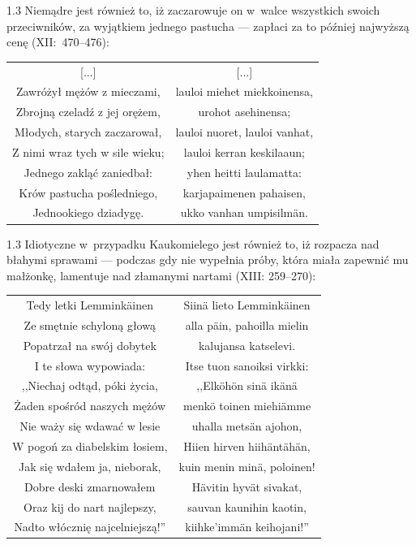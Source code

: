 \documentclass[11pt,a4paper,twoside]{report}
\begin{document}
\begin{spacing}{1.3}
Niemądre jest również to, iż zaczarowuje on w~walce wszystkich swoich przeciwników, za wyjątkiem jednego pastucha --- zapłaci za to później najwyższą cenę (XII:~470--476):
\end{spacing}
{\centering
\small
\begin{longtable}{c c}
{[...]} & {[...]} \\
Zawróżył mężów z mieczami, & lauloi miehet miekkoinensa, \\
Zbrojną czeladź z jej orężem, & urohot asehinensa; \\
Młodych, starych zaczarował, & lauloi nuoret, lauloi vanhat, \\
Z nimi wraz tych w sile wieku; & lauloi kerran keskilaaun; \\
Jednego zakląć zaniedbał: & yhen heitti laulamatta: \\
Krów pastucha pośledniego, & karjapaimenen pahaisen, \\
Jednookiego dziadygę. & ukko vanhan umpisilmän. \\
\end{longtable}
}
\newpage
\begin{spacing}{1.3}
Idiotyczne w~przypadku Kaukomielego jest również to, iż rozpacza nad błahymi sprawami --- podczas gdy nie wypełnia próby, która miała zapewnić mu małżonkę, lamentuje nad złamanymi nartami (XIII: 259--270):
\end{spacing}
{\centering
\small
\begin{longtable}{c c}
Tedy letki Lemminkäinen & Siinä lieto Lemminkäinen \\
Ze smętnie schyloną głową & alla päin, pahoilla mielin \\
Popatrzał na swój dobytek & kalujansa katselevi. \\
I te słowa wypowiada: & Itse tuon sanoiksi virkki: \\
,,Niechaj odtąd, póki życia, & ,,Elköhön sinä ikänä \\
Żaden spośród naszych mężów & menkö toinen miehiämme \\
Nie waży się wdawać w lesie & uhalla metsän ajohon, \\
W pogoń za diabelskim łosiem, & Hiien hirven hiihäntähän, \\
Jak się wdałem ja, nieborak, & kuin menin minä, poloinen! \\
Dobre deski zmarnowałem & Hävitin hyvät sivakat, \\
Oraz kij do nart najlepszy, & sauvan kaunihin kaotin, \\
Nadto włócznię najcelniejszą!'' & kiihke'immän keihojani!'' \\
\end{longtable}
}
\end{document}
